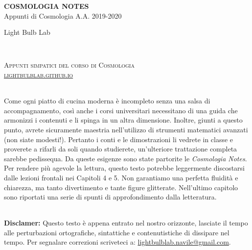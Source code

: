 \documentclass[11pt,fleqn]{book} %
\begin{document}

\begingroup
\thispagestyle{empty}
\centering
\vspace*{5cm}
\par\normalfont\fontsize{35}{35}\sffamily\selectfont
\textbf{COSMOLOGIA NOTES}\\
{\LARGE Appunti di Cosmologia A.A. 2019-2020}\par %
\vspace*{1cm}
{\Huge Light Bulb Lab}\par %
\endgroup


\newpage
~\vfill
\thispagestyle{empty}

\noindent \textsc{Appunti simpatici del corso di Cosmologia} \\

\noindent \textsc{\href{https://lightbulblab.github.io}{lightbulblab.github.io}} \\ %

~\vfill

\noindent Come ogni piatto di cucina moderna è incompleto senza una salsa di accompagnamento, così anche i corsi universitari necessitano di una guida che armonizzi i contenuti e li spinga in un altra dimensione. Inoltre, giunti a questo punto, avrete sicuramente maestria nell'utilizzo di strumenti matematici avanzati (non siate modesti!). Pertanto i conti e le dimostrazioni li vedrete in classe e proverete a rifarli da soli quando studierete, un'ulteriore trattazione completa sarebbe pedissequa.  Da queste esigenze sono state partorite le \textit{Cosmologia Notes}. Per rendere più agevole la lettura, questo testo potrebbe leggermente discostarsi dalle lezioni frontali nei Capitoli 4 e 5. Non garantiamo una perfetta fluidità e chiarezza, ma tanto divertimento e tante figure glitterate. Nell'ultimo capitolo sono riportati una serie di spunti di approfondimento dalla letteratura.  \\ %

~\vfill

\noindent \textbf{Disclamer:} Questo testo è appena entrato nel nostro orizzonte, lasciate il tempo alle perturbazioni ortografiche, sintattiche e contenutistiche di dissipare nel tempo. Per segnalare correzioni scriveteci a: \href{mailto:lightbulblab.navile@gmail.com}{lightbulblab.navile@gmail.com}. \\
\end{document}
